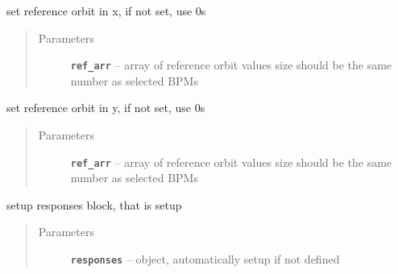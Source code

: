 \documentclass[letterpaper,10pt,english]{sphinxmanual}
\begin{document}
\begin{fulllineitems}
\begin{fulllineitems}
\begin{quote}
\begin{description}
\end{description}\end{quote}

\end{fulllineitems}


\begin{fulllineitems}
\label{src/apidocs/genopt:genopt.DakotaOC.set_ref_x0}
set reference orbit in x, if not set, use 0s
\begin{quote}\begin{description}
\item[{Parameters}] \leavevmode
\textbf{\texttt{ref\_arr}} -- array of reference orbit values
size should be the same number as selected BPMs

\end{description}\end{quote}

\end{fulllineitems}


\begin{fulllineitems}
\label{src/apidocs/genopt:genopt.DakotaOC.set_ref_y0}
set reference orbit in y, if not set, use 0s
\begin{quote}\begin{description}
\item[{Parameters}] \leavevmode
\textbf{\texttt{ref\_arr}} -- array of reference orbit values
size should be the same number as selected BPMs

\end{description}\end{quote}

\end{fulllineitems}


\begin{fulllineitems}
\label{src/apidocs/genopt:genopt.DakotaOC.set_responses}
setup responses block, that is setup 
\begin{quote}\begin{description}
\item[{Parameters}] \leavevmode
\textbf{\texttt{responses}} --  object, automatically setup if not defined


\end{description}
\end{quote}
\end{fulllineitems}
\end{fulllineitems}
\end{document}
